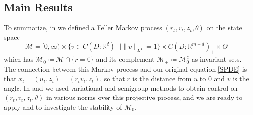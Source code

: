 \documentclass[final]{amsart}
\numberwithin{thm}{section}
\numberwithin{equation}{section}
\newcommand{\mcM}{\mathcal{M}}
\newcommand{\R}{\mathbb{R}}
\newcommand{\inv}{\mathcal{M}_+}
\begin{document}
    

    




























\subsection{Main Results}\label{SPDE-main-results}
To summarize, in  we defined a Feller Markov process $(r_t,v_t,z_t,\theta)$ on the state space
$$\mcM = [0,\infty) \times \{v \in C(\overline D;\R^d)_+ \mid \|v\|_{L^1} = 1\} \times C(\overline D;\R^{m-d})_+ \times \Theta$$
which has $\mcM_0 \coloneqq \mcM \cap \{r = 0\}$ and its complement $\inv \coloneqq \mcM_0^c$ as invariant sets. The connection between this Markov process and our original equation \eqref{SPDE} is that $x_t = (u_t,z_t) = (r_tv_t,z_t)$, so that $r$ is the distance from $u$ to $0$ and $v$ is the angle. In  and  we used variational and semigroup methods to obtain control on
$(r_t,v_t,z_t,\theta)$
in various norms over this projective process, and we are ready to apply  and  to investigate the stability of $\mcM_0$.
\end{document}
